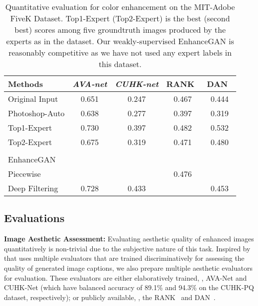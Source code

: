 \documentclass[sigconf]{acmart}
\begin{document}
\begin{table}[t]
\centering
\caption{\color{black}Quantitative evaluation for color enhancement on the MIT-Adobe FiveK Dataset. Top1-Expert (Top2-Expert) is the best (second best) scores among five groundtruth images produced by the experts as in the dataset. Our weakly-supervised EnhanceGAN is reasonably competitive as we have not used any expert labels in this dataset.\color{black}
}
\setlength{\tabcolsep}{2.8pt}
\begin{tabular}{lcccc}
Methods                                               & \textit{AVA-net} & \textit{CUHK-net} & RANK~\cite{kong2016photo} & DAN~\cite{deng2017image} \\ \hline 
Original Input                                                & 0.651     &  0.247       & 0.467       & 0.444                                    \\
Photoshop-Auto                                             & 0.638        & 0.277         & 0.397          & 0.319                                     \\                                             
Top1-Expert                                                  & 0.730        & 0.397         & 0.482          & 0.532                                     \\
Top2-Expert                                                 & 0.675        & 0.319         & 0.471          & 0.480                                     \\
                                             &     &          &        &                                     \\
EnhanceGAN                                                     &            &             &               &                                                 \\ \hline
Piecewise                                 &      &       & 0.476      &                                   \\    
Deep Filtering                               & 0.728     & 0.433      &          & 0.453   \\          
\end{tabular}
\label{tab:quantitative_aesthetics2}
\vskip -0.6cm
\end{table}


\subsection{Evaluations}
\label{sec:quantitative}
\noindent\textbf{Image Aesthetic Assessment:}
Evaluating aesthetic quality of enhanced images quantitatively is non-trivial due to the subjective nature of this task. Inspired by~\cite{dai2017towards} that uses multiple evaluators that are trained discriminatively for assessing the quality of generated image captions, we also prepare multiple aesthetic evaluators for evaluation.
These evaluators are either elaboratively trained, \ie, AVA-Net and CUHK-Net (which have balanced accuracy of 89.1\% and 94.3\% on the CUHK-PQ dataset, respectively); or publicly available, \ie, the RANK~\cite{kong2016photo} and DAN~\cite{deng2017image}.
\end{document}
